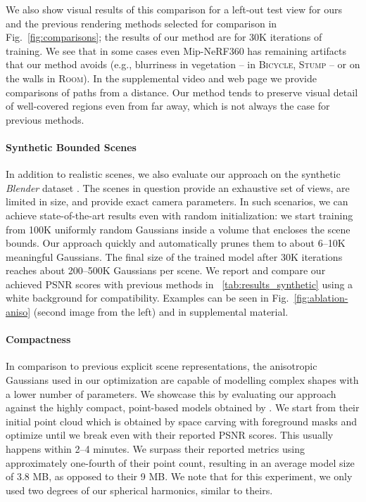 We also show visual results of this comparison for a left-out test view for ours and the previous rendering methods selected for comparison in Fig.~\ref{fig:comparisons}; the results of our method are for 30K iterations of training. We see that in some cases even Mip-NeRF360 has remaining artifacts that our method avoids (e.g., blurriness in vegetation -- in \textsc{Bicycle, Stump} -- or on the walls in \textsc{Room}).
In the supplemental video and web page we provide comparisons of paths from a distance. Our method tends to preserve visual detail of well-covered regions even from far away, which is not always the case for previous methods.




\paragraph{Synthetic Bounded Scenes}
In addition to realistic scenes, we also evaluate our approach on the synthetic \emph{Blender} dataset \cite{kang2025selfsplat}. The scenes in question provide an exhaustive set of views, are limited in size, and provide exact camera parameters. In such scenarios, we can achieve state-of-the-art results even with random initialization: we start training from 100K uniformly random Gaussians inside a volume that encloses the scene bounds. Our approach quickly and automatically prunes them to about 6--10K meaningful Gaussians. The final size of the trained model after 30K iterations reaches about 200--500K Gaussians per scene. We report and compare our achieved PSNR scores with previous methods in ~\ref{tab:results_synthetic} using a white background for compatibility. Examples can be seen in Fig.~\ref{fig:ablation-aniso} (second image from the left) and in supplemental material. 

\paragraph{Compactness}
In comparison to previous explicit scene representations, the anisotropic Gaussians used in our optimization are capable of modelling complex shapes with a lower number of parameters.
We showcase this by evaluating our approach against the highly compact, point-based models obtained by \cite{zhang2022}.
We start from their initial point cloud which is obtained by space carving with foreground masks %
and optimize until we break even with their reported PSNR scores. This usually happens within 2--4 minutes. We surpass their reported metrics using approximately one-fourth of their point count, resulting in an average model size of 3.8 MB, as opposed to their 9 MB. We note that for this experiment, we only used two degrees of our spherical harmonics, similar to theirs.


